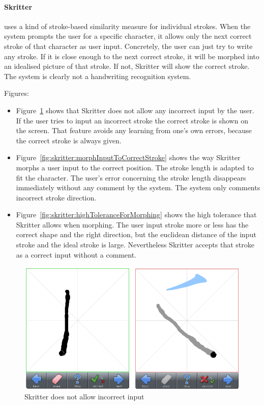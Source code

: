 \paragraph{Skritter} uses a kind of stroke-based similarity measure for 
individual strokes. When the system prompts the user for a specific character,
it allows only the next correct stroke of that character as user input. 
Concretely, the user can just try to write any stroke. If it is close enough to 
the next correct stroke, it will be morphed into an idealised picture of that 
stroke. If not, Skritter will show the correct stroke.
The system is clearly not a handwriting recognition system.

\noindent Figures:
\begin{itemize}
 \item 
 Figure~\ref{fig:skritter:noIncorrectInput} shows that Skritter does not allow
 any incorrect input by the user. If the user tries to input an incorrect stroke
 the correct stroke is shown on the screen. That feature avoids any learning 
 from one's own errors, because the correct stroke is always given.

 \item 
 Figure~\ref{fig:skritter:morphInputToCorrectStroke} shows the way Skritter 
 morphs a user input to the correct position. The stroke length is adapted to 
 fit the character. The user's error concerning the stroke length disappears 
immediately without any comment by the system. The system only comments incorrect
stroke direction.

 \item 
 Figure~\ref{fig:skritter:highToleranceForMorphing} shows the high tolerance that
 Skritter allows when morphing. The user input stroke more or less has the 
 correct shape and the right  direction, but the euclidean distance of the 
 input stroke and the ideal stroke is large. Nevertheless Skritter accepts that 
 stroke as a correct input without a comment.
\end{itemize}

\begin{figure}[htbp]
\begin{center}
\includegraphics[scale=0.7]{images/ConceptualDesign/skritter/noIncorrectInput.png}
\caption{Skritter does not allow incorrect input}
\label{fig:skritter:noIncorrectInput}
\end{center}
\end{figure}


